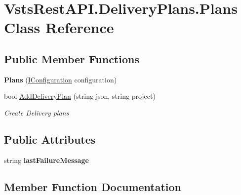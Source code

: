 \hypertarget{class_vsts_rest_a_p_i_1_1_delivery_plans_1_1_plans}{}\section{Vsts\+Rest\+A\+P\+I.\+Delivery\+Plans.\+Plans Class Reference}
\label{class_vsts_rest_a_p_i_1_1_delivery_plans_1_1_plans}
\subsection*{Public Member Functions}
\begin{DoxyCompactItemize}
\item 
\mbox{\label{class_vsts_rest_a_p_i_1_1_delivery_plans_1_1_plans_abb95b3f5c4e3bf5310ab6786a1a463bf}} 
{\bfseries Plans} (\mbox{\hyperlink{interface_vsts_rest_a_p_i_1_1_i_configuration}{I\+Configuration}} configuration)
\item 
bool \mbox{\hyperlink{class_vsts_rest_a_p_i_1_1_delivery_plans_1_1_plans_a8ed2253f78a26bc96e9717c84a881355}{Add\+Delivery\+Plan}} (string json, string project)
\begin{DoxyCompactList}\small\item\em Create Delivery plans \end{DoxyCompactList}\end{DoxyCompactItemize}
\subsection*{Public Attributes}
\begin{DoxyCompactItemize}
\item 
\mbox{\label{class_vsts_rest_a_p_i_1_1_delivery_plans_1_1_plans_a90d0e421c773cbe53c37ff93bfe1f216}} 
string {\bfseries last\+Failure\+Message}
\end{DoxyCompactItemize}


\subsection{Member Function Documentation}
\mbox{\label{class_vsts_rest_a_p_i_1_1_delivery_plans_1_1_plans_a8ed2253f78a26bc96e9717c84a881355}} 

